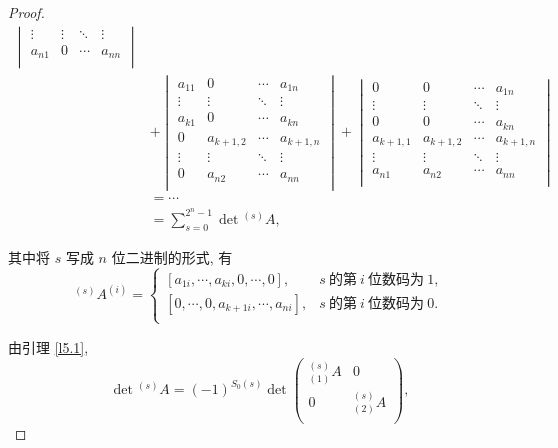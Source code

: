 \documentclass{ctexart}
\begin{document}
\begin{proof}
\begin{align*}
\begin{vmatrix}
            \vdots & \vdots & \ddots & \vdots \\
            a_{n1} & 0 & \cdots & a_{nn} \\
        \end{vmatrix} \\
        & +\begin{vmatrix}
            a_{11} & 0 & \cdots & a_{1n} \\
            \vdots & \vdots & \ddots & \vdots \\
            a_{k1} & 0 & \cdots & a_{kn} \\
            0 & a_{k+1,2} & \cdots & a_{k+1,n} \\
            \vdots & \vdots & \ddots & \vdots \\
            0 & a_{n2} & \cdots & a_{nn} \\
        \end{vmatrix}+\begin{vmatrix}
            0 & 0 & \cdots & a_{1n} \\
            \vdots & \vdots & \ddots & \vdots \\
            0 & 0 & \cdots & a_{kn} \\
            a_{k+1,1} & a_{k+1,2} & \cdots & a_{k+1,n} \\
            \vdots & \vdots & \ddots & \vdots \\
            a_{n1} & a_{n2} & \cdots & a_{nn} \\
        \end{vmatrix} \\
        & =\cdots \\
        & =\sum\limits_{s=0}^{2^n-1}\det{}^{(s)}A,
    \end{align*}

    其中将 $s$ 写成 $n$ 位二进制的形式, 有
    \[^{(s)}A^{(i)}=\begin{cases}
        [a_{1i},\cdots,a_{ki},0,\cdots,0], & s\ \text{的第}\ i\ \text{位数码为}\ 1, \\
        [0,\cdots,0,a_{k+1i},\cdots,a_{ni}], & s\ \text{的第}\ i\ \text{位数码为}\ 0 .\\
    \end{cases}\]

    由引理 \ref{l5.1},
    \[\det{}^{(s)}A=(-1)^{S_0(s)}\det\begin{pmatrix}
        {}_{(1)}^{(s)}A & 0 \\
        0 & {}_{(2)}^{(s)}A \\
    \end{pmatrix},\]


\end{proof}
\end{document}

